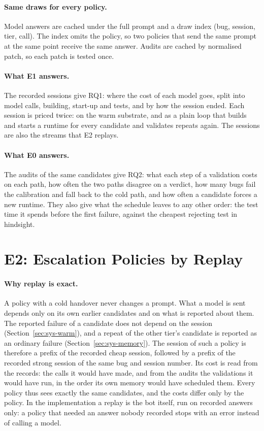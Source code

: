 \paragraph{Same draws for every policy.} Model answers are cached under the
full prompt and a draw index (bug, session, tier, call). The index omits the
policy, so two policies that send the same prompt at the same point receive
the same answer. Audits are cached by normalised patch, so each patch is
tested once.

\paragraph{What E1 answers.} The recorded sessions give RQ1: where the cost of
each model goes, split into model calls, building, start-up and tests, and by
how the session ended. Each session is priced twice: on the warm substrate,
and as a plain loop that builds and starts a runtime for every candidate and
validates repeats again. The sessions are also the streams that E2 replays.

\paragraph{What E0 answers.} The audits of the same candidates give RQ2: what
each step of a validation costs on each path, how often the two paths disagree
on a verdict, how many bugs fail the calibration and fall back to the cold
path, and how often a candidate forces a new runtime. They also give what the
schedule leaves to any other order: the test time it spends before the first
failure, against the cheapest rejecting test in hindsight.

\section{E2: Escalation Policies by Replay}
\label{sec:exp-e2}

\paragraph{Why replay is exact.} A policy with a cold handover never changes a
prompt. What a model is sent depends only on its own earlier candidates and on
what is reported about them. The reported failure of a candidate does not
depend on the session (Section~\ref{sec:sys-warm}), and a repeat of the other
tier's candidate is reported as an ordinary failure
(Section~\ref{sec:sys-memory}). The session of such a policy is therefore a
prefix of the recorded cheap session, followed by a prefix of the recorded
strong session of the same bug and session number. Its cost is read from the
records: the calls it would have made, and from the audits the validations it
would have run, in the order its own memory would have scheduled them. Every
policy thus sees exactly the same candidates, and the costs differ only by the
policy. In the implementation a replay is the bot itself, run on recorded
answers only: a policy that needed an answer nobody recorded stops with an
error instead of calling a model.


